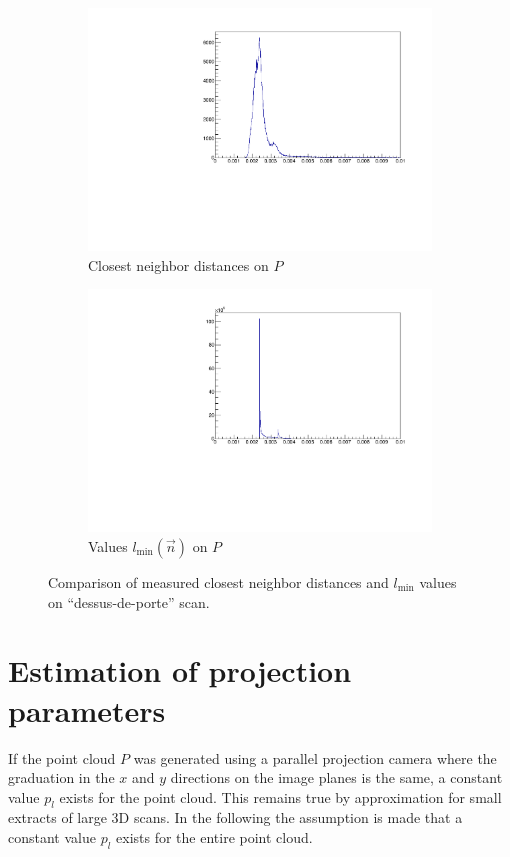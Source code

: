 \begin{figure}[H]
\centering
\begin{subfigure}{.5\textwidth}
	\includegraphics[width=\linewidth]{fig/ddp_nn.pdf}
	\caption{Closest neighbor distances on $P$}
\end{subfigure}%
\begin{subfigure}{.5\textwidth}
	\includegraphics[width=\linewidth]{fig/ddp_nn_lmin.pdf}
	\caption{Values $l_{\text{min}}(\vec{n})$ on $P$}
\end{subfigure}	
\caption{Comparison of measured closest neighbor distances and $l_\text{min}$ values on ``dessus-de-porte'' scan.}
\label{fig:ddp_nn_hist}
\end{figure}



\section{Estimation of projection parameters} \label{sec:estimate_proj_par}
If the point cloud $P$ was generated using a parallel projection camera where the graduation in the $x$ and $y$ directions on the image planes is the same, a constant value $p_l$ exists for the point cloud. This remains true by approximation for small extracts of large 3D scans. In the following the assumption is made that a constant value $p_l$ exists for the entire point cloud.

